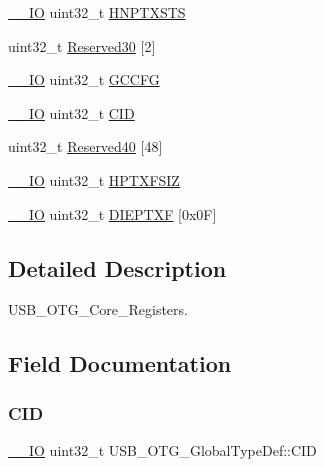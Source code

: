 \begin{DoxyCompactItemize}
\item 
\hyperlink{core__sc300_8h_aec43007d9998a0a0e01faede4133d6be}{\+\_\+\+\_\+\+IO} uint32\+\_\+t \hyperlink{struct_u_s_b___o_t_g___global_type_def_a99c998f37e7a88a26f22defb10a1e83a}{H\+N\+P\+T\+X\+S\+TS}
\item 
uint32\+\_\+t \hyperlink{struct_u_s_b___o_t_g___global_type_def_a978a73c27d2afe65def81f28b881e138}{Reserved30} \mbox{[}2\mbox{]}
\item 
\hyperlink{core__sc300_8h_aec43007d9998a0a0e01faede4133d6be}{\+\_\+\+\_\+\+IO} uint32\+\_\+t \hyperlink{struct_u_s_b___o_t_g___global_type_def_a9f94762e8ec6d3984e2da3f48bae8a7b}{G\+C\+C\+FG}
\item 
\hyperlink{core__sc300_8h_aec43007d9998a0a0e01faede4133d6be}{\+\_\+\+\_\+\+IO} uint32\+\_\+t \hyperlink{struct_u_s_b___o_t_g___global_type_def_a5c67046606b7e64fb03c4ac550156156}{C\+ID}
\item 
uint32\+\_\+t \hyperlink{struct_u_s_b___o_t_g___global_type_def_ab32b3885e27effc89f6ffe83d46ddd8e}{Reserved40} \mbox{[}48\mbox{]}
\item 
\hyperlink{core__sc300_8h_aec43007d9998a0a0e01faede4133d6be}{\+\_\+\+\_\+\+IO} uint32\+\_\+t \hyperlink{struct_u_s_b___o_t_g___global_type_def_ad50445f076f99e6b3d0cfb2643f40fac}{H\+P\+T\+X\+F\+S\+IZ}
\item 
\hyperlink{core__sc300_8h_aec43007d9998a0a0e01faede4133d6be}{\+\_\+\+\_\+\+IO} uint32\+\_\+t \hyperlink{struct_u_s_b___o_t_g___global_type_def_a8027d5b1a53306f5440506ae4915dd52}{D\+I\+E\+P\+T\+XF} \mbox{[}0x0\+F\mbox{]}
\end{DoxyCompactItemize}


\subsection{Detailed Description}
U\+S\+B\+\_\+\+O\+T\+G\+\_\+\+Core\+\_\+\+Registers. 

\subsection{Field Documentation}
\mbox{\label{struct_u_s_b___o_t_g___global_type_def_a5c67046606b7e64fb03c4ac550156156}} 
\subsubsection{\texorpdfstring{C\+ID}{CID}}
{\footnotesize\ttfamily \hyperlink{core__sc300_8h_aec43007d9998a0a0e01faede4133d6be}{\+\_\+\+\_\+\+IO} uint32\+\_\+t U\+S\+B\+\_\+\+O\+T\+G\+\_\+\+Global\+Type\+Def\+::\+C\+ID}

